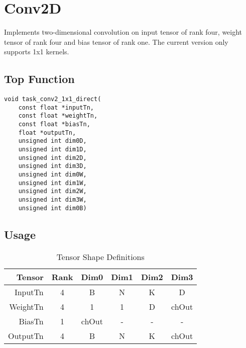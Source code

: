 \pagebreak












\section{Conv2D}
Implements two-dimensional convolution on input tensor of rank four, weight tensor of rank four and bias tensor of rank one. The current version only supports 1x1 kernels.

\subsection{Top Function}
\begin{lstlisting}
void task_conv2_1x1_direct(
	const float *inputTn,
	const float *weightTn,
	const float *biasTn,
	float *outputTn,
	unsigned int dim0D,
	unsigned int dim1D,
	unsigned int dim2D,
	unsigned int dim3D,
	unsigned int dim0W,
	unsigned int dim1W,
	unsigned int dim2W,
	unsigned int dim3W,
	unsigned int dim0B)
\end{lstlisting}

\subsection{Usage}
\begin{table}[htbp] %
\caption{Tensor Shape Definitions}
\label{tab:shapes_concat}
	\begin{center}
		\begin{tabular}{|r|c|c|c|c|c|} 
		\hline	
		Tensor & Rank & Dim0 & Dim1 & Dim2 & Dim3\\ 
		\hline	
		InputTn &
			4 & 
			B &
			N &
			K &
			D\\ 
		\hline	
		WeightTn &
			4 & 
			1 &
			1 &
			D &
			chOut\\ 
		\hline
		BiasTn &
			1 & 
			chOut &
			- &
			- &
			-\\ 
		\hline
		OutputTn &
			4 & 
			B & 
			N & 
			K &
			chOut \\
		\hline
		\end{tabular}
	\end{center}
\end{table}

